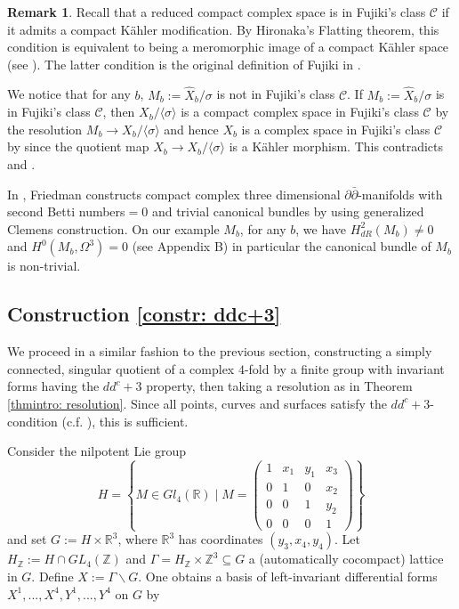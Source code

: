 \documentclass[12pt,reqno]{amsart}
\theoremstyle{definition}
\newtheorem{rem}[thm]{Remark}
\newcommand{\Z}{\mathbb{Z}}
\newcommand{\R}{\mathbb{R}}
\begin{document}
\begin{rem}
Recall that a reduced  compact complex space is  in Fujiki's class $\mathcal C$ if it  admits  a compact K\"ahler modification.
By Hironaka's Flatting theorem, this condition is equivalent to being  a meromorphic image of  a compact K\"ahler space (see \cite[Theorem 5]{Var}).
The latter condition is the original definition  of Fujiki in \cite{Fuj}.

We notice that for any $b$,  $M_b:=\hat{X}_b/\sigma$ is not in Fujiki's class $\mathcal C$.
If $M_b:=\hat{X}_b/\sigma$ is in Fujiki's class $\mathcal C$, then   $X_{b}/\langle \sigma\rangle $ is a compact complex space in Fujiki's class $\mathcal C$  by the resolution  $M_b\to X_{b}/\langle \sigma\rangle $ and hence $X_{b}$ is a complex space  in  Fujiki's class $\mathcal C$ by \cite[Lemma 4.6]{Fuj} since the quotient map $X_{b}\to X_{b}/\langle \sigma\rangle $ is a K\"ahler morphism. This contradicts \cite[Theorem 3.3]{AK14} and \cite[Main Theorem]{Has}.

In \cite{Fri}, Friedman constructs compact complex three dimensional  $\partial\bar\partial$-manifolds with second Betti numbers$=0$ and   trivial canonical bundles by using generalized Clemens construction.
On our example $M_b$, for any $b$, we have $H^2_{dR}(M_b)\not=0$ and  $H^0(M_b, \Omega^3)=0$ (see Appendix B) in particular the canonical bundle of $M_b$ is non-trivial.



\end{rem}

\subsection{Construction \ref{constr: ddc+3}}
We proceed in a similar fashion to the previous section, constructing a simply connected, singular quotient of a complex $4$-fold by a finite group with invariant forms having the $dd^c+3$ property, then taking a resolution as in Theorem \ref{thmintro: resolution}. Since all points, curves and surfaces satisfy the $dd^c+3$-condition (c.f. \cite{SW22}), this is sufficient.

Consider the nilpotent Lie group 
\[
H=\left\{M\in Gl_4(\R)\mid M=\begin{pmatrix}
1 & x_1 & y_1 & x_3\\
0 & 1 & 0 & x_2\\
0 & 0 & 1 & y_2\\
0 & 0 & 0 & 1
\end{pmatrix}\right\}
\]
and set $G:=H\times \R^3$, where $\R^3$ has coordinates $(y_3,x_4,y_4)$. Let $H_\Z:=H\cap GL_4(\Z)$ and $\Gamma=H_\Z\times\Z^3\subseteq G$ a (automatically cocompact) lattice in $G$. Define $X:=\Gamma\backslash G$.
One obtains a basis of left-invariant differential forms $X^1,...,X^4,Y^1,...,Y^4$ on $G$ by
\end{document}
